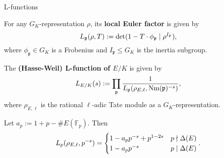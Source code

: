 \documentclass[10pt]{beamer}
\begin{document}
\begin{frame}[t]{L-functions}

For any $ G_K $-representation $ \rho $, its \textbf{local Euler factor} is given by
\vspace{-0.2cm} $$ \vspace{-0.2cm} L_\mathfrak{p}(\rho, T) := \det(1 - T \cdot \phi_\mathfrak{p} \mid \rho^{I_\mathfrak{p}}), $$
where $ \phi_\mathfrak{p} \in G_K $ is a Frobenius and $ I_\mathfrak{p} \le G_K $ is the inertia subgroup.

\pause

\vspace{0.5cm} The \textbf{(Hasse-Weil) L-function of $ E / K $} is given by
\vspace{-0.2cm} $$ \vspace{-0.2cm} L_{E / K}(s) := \prod_\mathfrak{p} \dfrac{1}{L_\mathfrak{p}(\rho_{E, \ell}, \mathrm{Nm}(\mathfrak{p})^{-s})}, $$
where $ \rho_{E, \ell} $ is the rational $ \ell $-adic Tate module as a $ G_K $-representation.

\pause

\begin{example}[$ K = \mathbb{Q} $]
Let $ a_p := 1 + p - \#E(\mathbb{F}_p) $. Then
\vspace{-0.2cm} $$ \vspace{-0.2cm} L_p(\rho_{E, \ell}, p^{-s}) =
\begin{cases}
1 - a_pp^{-s} + p^{1 - 2s} & p \nmid \Delta(E) \\
1 - a_pp^{-s} & p \mid \Delta(E)
\end{cases}.
$$
\end{example}

\end{frame}
\end{document}
